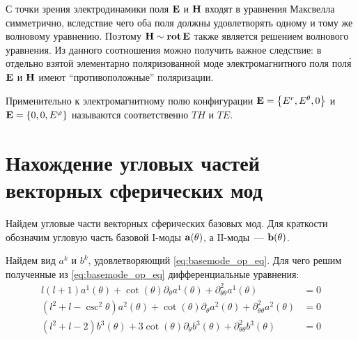 \documentclass[12pt,a4paper]{article}
\begin{document}
        С точки зрения электродинамики поля $\vb{E}$ и $\vb{H}$ входят в уравнения Максвелла симметрично, вследствие чего оба поля должны удовлетворять одному и тому же волновому уравнению. Поэтому $\vb{H} \sim \operatorname{\mathbf{rot}}{\vb{E}}$ также является решением волнового уравнения. Из данного соотношения можно получить важное следствие: в отдельно взятой элементарно поляризованной моде электромагнитного поля пол\'{я} $\vb{E}$ и $\vb{H}$ имеют \enquote{противоположные} поляризации.

        Применительно к электромагнитному полю конфигурации $\vb{E} = \qty{ E^r, E^\theta, 0 }$ и $\vb{E} = \qty{ 0, 0, E^\varphi }$ называются соответственно\footnotemark{} $TH$ и $TE$.



    \section{Нахождение угловых частей векторных сферических мод}

        Найдем угловые части векторных сферических базовых мод. Для краткости обозначим угловую часть базовой $\mathrm{I}$-моды $\vb{a}(\theta)$, а $\mathrm{II}$-моды~--- $\vb{b}(\theta)$.

        Найдем вид $a^k$ и $b^k$, удовлетворяющий \autoref{eq:basemode_op_eq}. Для чего решим полученные из \autoref{eq:basemode_op_eq} дифференциальные уравнения:
        \begin{equation}\begin{aligned}
            l (l + 1) a^1(\theta)
                + \cot(\theta) \partial_\theta a^1(\theta)
                + \partial^2_{\theta\theta} a^1(\theta) &= 0 \\
            (l^2 + l - \csc^2\theta) a^2(\theta)
                + \cot(\theta) \partial_\theta a^2(\theta)
                + \partial^2_{\theta\theta} a^2(\theta) &= 0 \\
            (l^2 + l - 2) b^3(\theta)
                + 3 \cot(\theta) \partial_\theta b^3(\theta)
                + \partial^2_{\theta\theta} b^3(\theta) &= 0
        \end{aligned}\end{equation}
\end{document}
